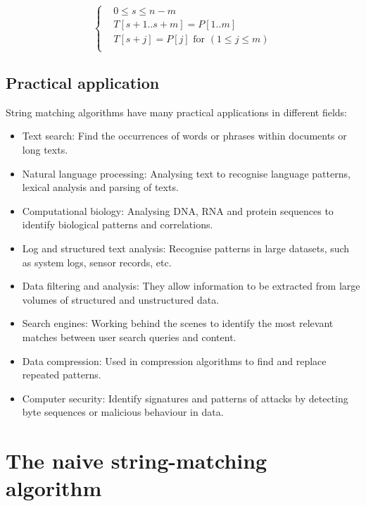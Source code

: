 \documentclass[11pt]{article}
\begin{document}
            \[
                \left\{
                \begin{aligned}
                    & 0 \leq s \leq n - m \\
                    & T[s+1..s+m] = P[1..m] \\
                    & T[s+j] = P[j] \text{ for } (1 \leq j \leq m) \\
                \end{aligned}
                \right.
            \]

        \subsection{Practical application} \label{subsec:practical_application}

            String matching algorithms have many practical applications in different fields:
            \begin{itemize}
                \item Text search: Find the occurrences of words or phrases within documents or long texts.
                \item Natural language processing: Analysing text to recognise language patterns, lexical analysis and parsing of texts.
                \item Computational biology: Analysing DNA, RNA and protein sequences to identify biological patterns and correlations.
                \item Log and structured text analysis: Recognise patterns in large datasets, such as system logs, sensor records, etc.
                \item Data filtering and analysis: They allow information to be extracted from large volumes of structured and unstructured data.
                \item Search engines: Working behind the scenes to identify the most relevant matches between user search queries and content.
                \item Data compression: Used in compression algorithms to find and replace repeated patterns.
                \item Computer security: Identify signatures and patterns of attacks by detecting byte sequences or malicious behaviour in data.
            \end{itemize}

    \section{The naive string-matching algorithm} \label{sec:naive_string_matching_algorithm}
\end{document}
